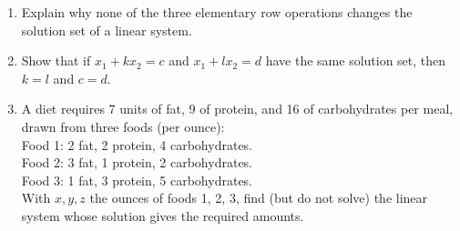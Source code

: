 \documentclass{article}
\theoremstyle{mystyle}
\begin{document}
\begin{enumerate}
    \item[22.] Explain why none of the three elementary row operations changes the solution set of a linear system.

    \item[23.] Show that if $x_1+kx_2=c$ and $x_1+lx_2=d$ have the same solution set, then $k=l$ and $c=d$.

    \item[25.] A diet requires 7 units of fat, 9 of protein, and 16 of carbohydrates per meal, drawn from three foods (per ounce):\\
    Food 1: 2 fat, 2 protein, 4 carbohydrates.\\
    Food 2: 3 fat, 1 protein, 2 carbohydrates.\\
    Food 3: 1 fat, 3 protein, 5 carbohydrates.\\
    With $x,y,z$ the ounces of foods 1, 2, 3, find (but do not solve) the linear system whose solution gives the required amounts.
\end{enumerate}
\end{document}
